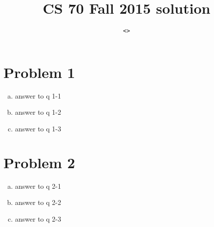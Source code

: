 \documentclass{article}
\begin{document}
\setlength{\parindent}{0px}





\title{CS 70 Fall 2015 \ReplaceMeWithAssignmentName{} solution}
\author{\myname{} \texttt{<\myemail>}}
\date{} %
\maketitle





\section{Problem 1}
\begin{enumerate}[(a)]
    \item answer to q 1-1
    \item answer to q 1-2
    \item answer to q 1-3
\end{enumerate}





\section{Problem 2}
\begin{enumerate}[(a)]
    \item answer to q 2-1
    \item answer to q 2-2
    \item answer to q 2-3
\end{enumerate}






\end{document}
